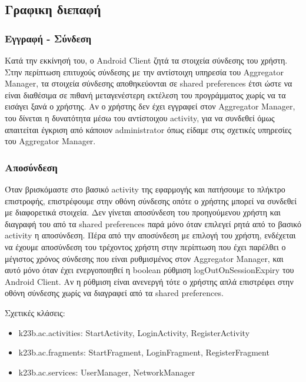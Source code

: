 \documentclass[a4paper,11pt]{article}
\begin{document}
\begin{sloppypar}
\subsection{Γραφικη διεπαφή
}
\subsubsection{Εγγραφή - Σύνδεση}

Κατά την εκκίνησή του, ο Android Client ζητά τα στοιχεία σύνδεσης του χρήστη. Στην περίπτωση επιτυχούς σύνδεσης με την αντίστοιχη υπηρεσία του Aggregator Manager, τα στοιχεία σύνδεσης αποθηκεύονται σε shared preferences έτσι ώστε να είναι διαθέσιμα σε πιθανή μεταγενέστερη εκτέλεση του προγράμματος χωρίς να τα εισάγει ξανά ο χρήστης. Αν ο χρήστης δεν έχει εγγραφεί στον Aggregator Manager, του δίνεται η δυνατότητα μέσω του αντίστοιχου activity, για να συνδεθεί όμως απαιτείται έγκριση από κάποιον administrator όπως είδαμε στις σχετικές υπηρεσίες του Aggregator Manager.

\subsubsection{Αποσύνδεση}

Όταν βρισκόμαστε στο βασικό activity της εφαρμογής και πατήσουμε το πλήκτρο επιστροφής, επιστρέφουμε στην οθόνη σύνδεσης οπότε ο χρήστης μπορεί να συνδεθεί με διαφορετικά στοιχεία. Δεν γίνεται αποσύνδεση του προηγούμενου χρήστη και διαγραφή του από τα shared preferences παρά μόνο όταν επιλεγεί ρητά από το βασικό activity η αποσύνδεση. Πέρα από την αποσύνδεση με επιλογή του χρήστη, ενδέχεται να έχουμε αποσύνδεση του τρέχοντος χρήστη στην περίπτωση που έχει παρέλθει ο μέγιστος χρόνος σύνδεσης που είναι ρυθμισμένος στον Aggregator Manager, και αυτό μόνο όταν έχει ενεργοποιηθεί η boolean ρύθμιση logOutOnSessionExpiry του Android Client. Αν η ρύθμιση είναι ανενεργή τότε ο χρήστης απλά επιστρέφει στην οθόνη σύνδεσης χωρίς να διαγραφεί από τα shared preferences.
\newline

Σχετικές κλάσεις:

\begin{itemize}

\item k23b.ac.activities: StartActivity, LoginActivity, RegisterActivity

\item k23b.ac.fragments: StartFragment, LoginFragment, RegisterFragment

\item k23b.ac.services: UserManager, NetworkManager


\end{itemize}
\end{sloppypar}
\end{document}
